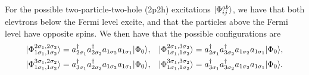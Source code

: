For the possible two-particle-two-hole (2p2h) excitations $\lvert\Phi_{ij}^{ab}\rangle$, we have that both elevtrons below the Fermi level excite, and that the particles above the Fermi level have opposite spins.
We then have that the possible configurations are
\begin{align*}
    \lvert\Phi_{1\sigma_1, 1\sigma_2}^{2\sigma_1, 2\sigma_2}\rangle &= a_{2\sigma_1}^\dagger a_{2\sigma_2}^\dagger a_{1\sigma_2} a_{1\sigma_1} \lvert\Phi_0\rangle, &
    \lvert\Phi_{1\sigma_1, 1\sigma_2}^{2\sigma_1, 3\sigma_2}\rangle &= a_{2\sigma_1}^\dagger a_{3\sigma_2}^\dagger a_{1\sigma_2} a_{1\sigma_1} \lvert\Phi_0\rangle, \\
    \lvert\Phi_{1\sigma_1, 1\sigma_2}^{3\sigma_1, 2\sigma_2}\rangle &= a_{3\sigma_1}^\dagger a_{2\sigma_2}^\dagger a_{1\sigma_2} a_{1\sigma_1} \lvert\Phi_0\rangle, &
    \lvert\Phi_{1\sigma_1, 1\sigma_2}^{3\sigma_1, 3\sigma_2}\rangle &= a_{3\sigma_1}^\dagger a_{3\sigma_2}^\dagger a_{1\sigma_2} a_{1\sigma_1} \lvert\Phi_0\rangle.
\end{align*}

